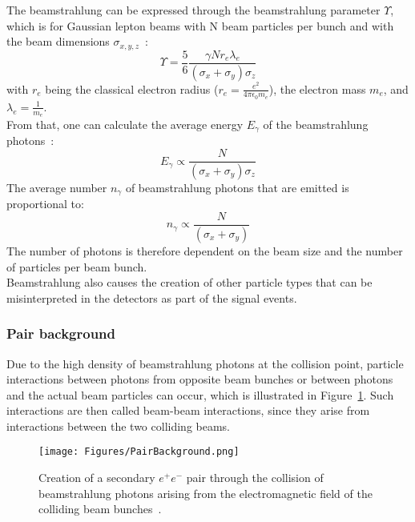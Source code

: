 The beamstrahlung can be expressed through the beamstrahlung parameter $\Upsilon$, which is for Gaussian lepton beams with N beam particles per bunch and with the beam dimensions $\sigma_{x,y,z}$~\cite{PairBkg_cross_section, AndreSailer}:
\begin{equation}
 \Upsilon=\frac{5}{6}\frac{\gamma N r_e \lambda_e}{(\sigma_x+\sigma_y)\sigma_z}
\end{equation}
with $r_e$ being the classical electron radius ($r_e = \frac{e^2}{4\pi \epsilon_0 m_e}$), the electron mass $m_e$, and $\lambda_e=\frac{1}{m_e}$.\\
From that, one can calculate the average energy $E_{\gamma}$ of the beamstrahlung photons~\cite[p. 77]{Beamstrahlung_CLIC}:
\begin{equation}
 E_{\gamma} \propto \frac{N}{(\sigma_x+\sigma_y)\sigma_z}
 \label{eq:pair_energy}
\end{equation}
The average number $n_{\gamma}$ of beamstrahlung photons that are emitted is proportional to:
\begin{equation}
 n_{\gamma} \propto \frac{N}{(\sigma_x+\sigma_y)}
 \label{eq:pair_number}
\end{equation}
The number of photons is therefore dependent on the beam size and the number of particles per beam bunch.
\\Beamstrahlung also causes the creation of other particle types that can be misinterpreted in the detectors as part of the signal events.

\subsubsection{Pair background}
\label{BeamBeam:pairs}
Due to the high density of beamstrahlung photons at the collision point, particle interactions between photons from opposite beam bunches or between photons and the actual beam particles can occur, which is illustrated in Figure~\ref{fig:Pair_production}.
Such interactions are then called beam-beam interactions, since they arise from interactions between the two colliding beams.
\begin{figure}
\centering
\texttt{[image: Figures/PairBackground.png]}
\caption[Illustration of secondary $e^+e^-$ pair production from beamstrahlung photons]{Creation of a secondary $e^+e^-$ pair through the collision of beamstrahlung photons arising from the electromagnetic field of the colliding beam bunches~\cite[p. 29]{Vogel}.}
\label{fig:Pair_production} 
\end{figure}

